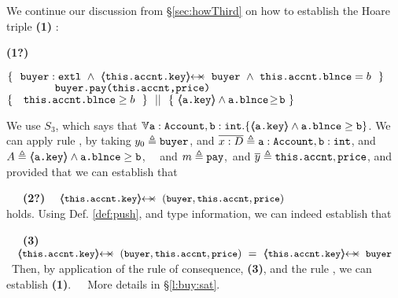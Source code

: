 \begin{example}
We continue our discussion from \S \ref{sec:howThird} on how to establish the Hoare triple    \textbf{(1)} :

 \vspace{.05cm}
  \begin{minipage}{.05\textwidth}
   \textbf{(1?)}\ \ 
\end{minipage}
\hfill
\begin{minipage}{.95\textwidth}
\begin{flushleft}
$\{\  \   \external{\prg{buyer}} \ \wedge\ 
   {\protectedFrom {\prg{this.\myAccount.key}}  {\prg{buyer} } }
 \ \wedge\ \prg{this.\myAccount.\balance}= b  \ \  \}$\\
$\ \ \ \ \ \ \ \ \ \ \ \ {\ \mbox{\normalfont{\texttt{buyer.pay(this.accnt,price)}}}   \ } $\\
$  \{\  \ \  {\mbox{\normalfont{\texttt{this.\mbox{\normalfont{\texttt{accnt}}}.\mbox{\normalfont{\texttt{blnce}}}}}}} \geq  b \  \  \} \ \ ||\ \  \{\ \langle\!\!\langle \mbox{\normalfont{\texttt{a.key}}} \rangle\!\!\rangle\wedge  \mbox{\normalfont{\texttt{a.\mbox{\normalfont{\texttt{blnce}}}}}}\!\geq\!{\mbox{\normalfont{\texttt{b}}}}   \ \}  $ 
\end{flushleft}
\end{minipage}
 
\vspace{.03cm}
\noindent
We use $S_3$, which says that $\TwoStatesN{ \prg{a}:\prg{Account},\prg{b}:\prg{int} } {\inside{\prg{a.key}} \wedge \prg{a.\balance} \geq \prg{b} }$. 
We can apply rule {}, by taking  $y_0 \triangleq \mbox{\normalfont{\texttt{buyer}}}$,  and $\overline {x : D}\triangleq \mbox{\normalfont{\texttt{a}}}:\mbox{\normalfont{\texttt{Account}}},\mbox{\normalfont{\texttt{b}}}:\mbox{\normalfont{\texttt{int}}}$, 
and $A \triangleq  \langle\!\!\langle \mbox{\normalfont{\texttt{a.key}}} \rangle\!\!\rangle\wedge \mbox{\normalfont{\texttt{a.\mbox{\normalfont{\texttt{blnce}}}}}}\geq \mbox{\normalfont{\texttt{b}}}$, \ \ 
and $m \triangleq \mbox{\normalfont{\texttt{pay}}}$,\ and $\overline {y} \triangleq \mbox{\normalfont{\texttt{this.accnt}}},\mbox{\normalfont{\texttt{price}}}$,
and provided that we can establish that\\
\strut \ \ \   \textbf{(2?)}  $ {\small{\strut \ \ \ \protectedFrom {\prg{this.\myAccount.key}} {(\prg{buyer},\prg{this.\myAccount},\prg{price})}}}$\\
holds. Using   Def. \ref{def:push}, and type information, we can indeed establish that\\
\strut \ \ \   \textbf{(3)} $ {\small{\strut \ \ \ \protectedFrom {\prg{this.\myAccount.key}} {(\prg{buyer},\prg{this.\myAccount},\prg{price})}  \ = \   \protectedFrom {\prg{this.\myAccount.key}} {\prg{buyer}}}}$\
Then, by application of the rule of consequence, \textbf{(3)}, and the rule {}, we can establish \textbf{(1)}.\ \ \ 
More details in \S  \ref{l:buy:sat}.
\end{example}


